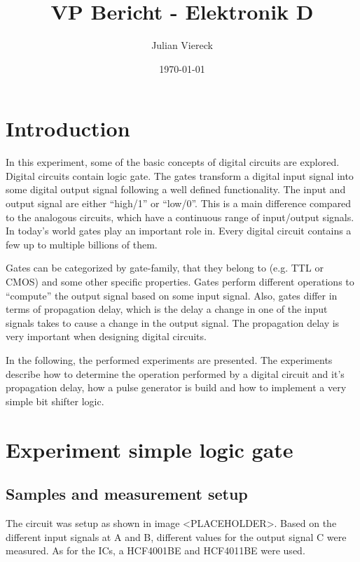 \documentclass[journal]{IEEEtran}
\title{VP Bericht - Elektronik D}
\author{Julian Viereck}
\date{\today}                                           %
\begin{document}
\maketitle

\begin{abstract}
\end{abstract}

\tableofcontents

\section{Introduction}

In this experiment, some of the basic concepts of digital circuits are explored.
Digital circuits contain logic gate. The gates transform a
digital input signal into some digital output signal following a well defined functionality.
The input and output signal are either ``high/1'' or ``low/0''. This is a main
difference compared to the analogous circuits, which have a continuous range of
input/output signals. In today's world gates play an important role in. Every
digital circuit contains a few up to multiple billions of them.

Gates can be categorized by gate-family, that they belong to (e.g. TTL or CMOS)
and some other specific properties. Gates perform different operations to
``compute'' the output signal based on some input signal. Also, gates differ in
terms of propagation delay, which is the delay a change in one of the input
signals takes to cause a change in the output signal. The propagation delay is
very important when designing digital circuits.

In the following, the performed experiments are presented. The experiments
describe how to determine the operation performed by a digital circuit and it's
propagation delay, how a pulse generator is build and how to implement a very
simple bit shifter logic.

\section{Experiment simple logic gate}

\subsection{Samples and measurement setup}

The circuit was setup as shown in image <PLACEHOLDER>. Based on the
different input signals at A and B, different values for the output signal C
were measured. As for the ICs, a HCF4001BE and HCF4011BE were used.
\end{document}
